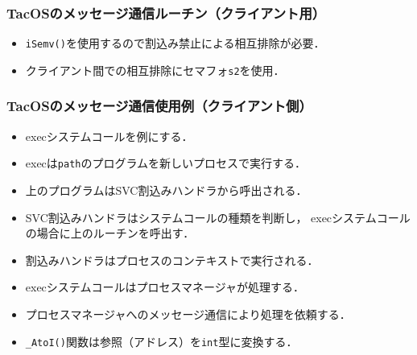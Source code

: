 \documentclass[dvipdfmx]{beamer}
\begin{document}
\begin{frame}
  \frametitle{TacOSのメッセージ通信ルーチン（クライアント用）}
  
  \begin{itemize}
  \item {\tt iSemv()}を使用するので割込み禁止による相互排除が必要．
  \item クライアント間での相互排除にセマフォ{\tt s2}を使用．
  \end{itemize}
\end{frame}

\begin{frame}
  \frametitle{TacOSのメッセージ通信使用例（クライアント側）}
  
  \begin{itemize}
  \item execシステムコールを例にする．
  \item execは{\tt path}のプログラムを新しいプロセスで実行する．
  \item 上のプログラムはSVC割込みハンドラから呼出される．
  \item SVC割込みハンドラはシステムコールの種類を判断し，
    execシステムコールの場合に上のルーチンを呼出す．
  \item 割込みハンドラはプロセスのコンテキストで実行される．
  \item execシステムコールはプロセスマネージャが処理する．
  \item プロセスマネージャへのメッセージ通信により処理を依頼する．
  \item {\tt \_AtoI()}関数は参照（アドレス）を{\tt int}型に変換する．
  \end{itemize}
\end{frame}
\end{document}

